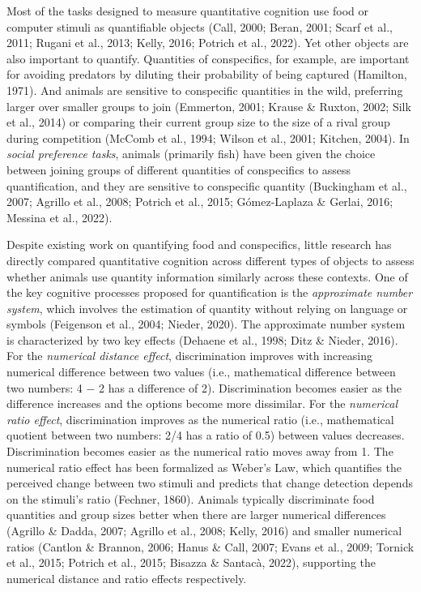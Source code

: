 \documentclass[
  ,pub,floatsintext]{apa6}
\begin{document}
Most of the tasks designed to measure quantitative cognition use food or computer stimuli as quantifiable objects (Call, 2000; Beran, 2001; Scarf et al., 2011; Rugani et al., 2013; Kelly, 2016; Potrich et al., 2022). Yet other objects are also important to quantify. Quantities of conspecifics, for example, are important for avoiding predators by diluting their probability of being captured (Hamilton, 1971). And animals are sensitive to conspecific quantities in the wild, preferring larger over smaller groups to join (Emmerton, 2001; Krause \& Ruxton, 2002; Silk et al., 2014) or comparing their current group size to the size of a rival group during competition (McComb et al., 1994; Wilson et al., 2001; Kitchen, 2004). In \emph{social preference tasks}, animals (primarily fish) have been given the choice between joining groups of different quantities of conspecifics to assess quantification, and they are sensitive to conspecific quantity (Buckingham et al., 2007; Agrillo et al., 2008; Potrich et al., 2015; Gómez-Laplaza \& Gerlai, 2016; Messina et al., 2022).

Despite existing work on quantifying food and conspecifics, little research has directly compared quantitative cognition across different types of objects to assess whether animals use quantity information similarly across these contexts. One of the key cognitive processes proposed for quantification is the \emph{approximate number system}, which involves the estimation of quantity without relying on language or symbols (Feigenson et al., 2004; Nieder, 2020). The approximate number system is characterized by two key effects (Dehaene et al., 1998; Ditz \& Nieder, 2016). For the \emph{numerical distance effect}, discrimination improves with increasing numerical difference between two values (i.e., mathematical difference between two numbers: 4 \(-\) 2 has a difference of 2). Discrimination becomes easier as the difference increases and the options become more dissimilar. For the \emph{numerical ratio effect}, discrimination improves as the numerical ratio (i.e., mathematical quotient between two numbers: 2/4 has a ratio of 0.5) between values decreases. Discrimination becomes easier as the numerical ratio moves away from 1. The numerical ratio effect has been formalized as Weber's Law, which quantifies the perceived change between two stimuli and predicts that change detection depends on the stimuli's ratio (Fechner, 1860). Animals typically discriminate food quantities and group sizes better when there are larger numerical differences (Agrillo \& Dadda, 2007; Agrillo et al., 2008; Kelly, 2016) and smaller numerical ratios (Cantlon \& Brannon, 2006; Hanus \& Call, 2007; Evans et al., 2009; Tornick et al., 2015; Potrich et al., 2015; Bisazza \& Santacà, 2022), supporting the numerical distance and ratio effects respectively.
\end{document}
